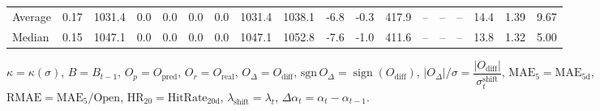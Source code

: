 \begin{threeparttable}
{\begin{tabular}{lrrrrrrrrrrrrrrrrr}
Average &     0.17 & 1031.4 &               0.0 &               0.0 &                0.0 &                0.0 & 1031.4 & 1038.1 &       -6.8 &                     -0.3 &               417.9 &         -- &        -- &             -- &             14.4 &            1.39 &                   9.67 \\
 Median &     0.15 & 1047.1 &               0.0 &               0.0 &                0.0 &                0.0 & 1047.1 & 1052.8 &       -7.6 &                     -1.0 &               411.6 &         -- &        -- &             -- &             13.8 &            1.32 &                   5.00 \\
\bottomrule
\end{tabular}
}
\begin{tablenotes}\footnotesize
\item $\kappa=\kappa(\sigma)$, $B=B_{t-1}$, $O_p=O_{\text{pred}}$, $O_r=O_{\text{real}}$, $O_\Delta=O_{\text{diff}}$, $\mathrm{sgn}\,O_\Delta=\operatorname{sign}(O_{\text{diff}})$, $|O_\Delta|/\sigma=\dfrac{|O_{\text{diff}}|}{\sigma_t^{\text{shift}}}$, $\mathrm{MAE}_5=\mathrm{MAE}_{5\text{d}}$, $\mathrm{RMAE}= \mathrm{MAE}_5 / \text{Open}$, $\mathrm{HR}_{20}=\mathrm{HitRate}_{20\text{d}}$, 
$\lambda_{\text{shift}}=\lambda_t$, 
$\Delta\alpha_t=\alpha_t-\alpha_{t-1}$.
\end{tablenotes}
\end{threeparttable}
\endgroup


